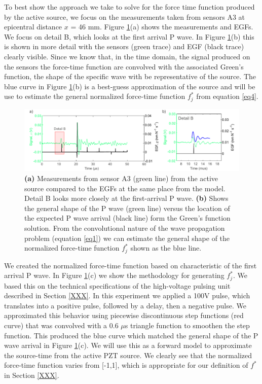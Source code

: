 \documentclass[preprint,3p, 11pt,authoryear]{elsarticle}
\begin{document}
{To best show the approach we take to solve for the force time function produced by the active source, we focus on the measurements taken from sensors A3 at epicentral distance $x$ = 46 mm. Figure \ref{fig5}(a) shows the measurements and EGFs.  We focus on detail B, which looks at the first arrival P wave.  In Figure \ref{fig5}(b) this is shown in more detail with the sensors (green trace) and EGF (black trace) clearly visible.  Since we know that, in the time domain, the signal produced on the sensors the force-time function are convolved with the associated Green's function, the shape of the specific wave with be representative of the source. The blue curve in Figure \ref{fig5}(b) is a best-guess approximation of the source and will be use to estimate the general normalized force-time function $f^{*}_{j}$ from equation \eqref{eq4}.

\begin{figure}[ht]
     	\centering
\includegraphics[scale= 0.85]{FIG5.pdf} 
\caption{\textbf{(a)} Measurements from sensor A3 (green line) from the active source compared to the EGFs at the same place from the model.  Detail B looks more closely at the first-arrival P wave. \textbf{(b)} Shows the general shape of the P wave (green line) versus the location of the expected P wave arrival (black line) form the Green's function solution.  From the convolutional nature of the wave propagation problem (equation \eqref{eq1}) we can estimate the general shape of the normalized force-time function $f^{*}_{j}$ shown as the blue line.}
	\label{fig5} 
\end{figure}

 We created the normalized force-time function based on characteristic of the first arrival P wave.  In Figure \ref{fig5}(c) we show the methodology for generating $f^{*}_{j}$.  We based this on the technical specifications of the high-voltage pulsing unit described in Section \ref{XXX}. In this experiment we applied a 100V pulse, which translates into a positive pulse, followed by a delay, then a negative pulse.  We approximated this behavior using piecewise discontinuous step functions (red curve) that was convolved with a 0.6 $\mu$s triangle function to smoothen the step function. This produced the blue curve which matched the general shape of the P wave arrival in Figure \ref{fig5}(c).  We will use this as a forward model to approximate the source-time from the active PZT source. We clearly see that the normalized force-time function varies from [-1,1], which is appropriate for our definition of $f^{*}$ in Section \ref{XXX}.



}
\end{document}
